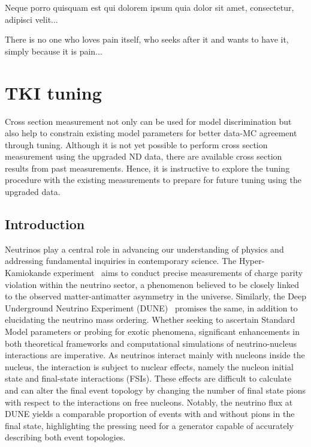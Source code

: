 \begin{savequote}[8cm]
\textlatin{Neque porro quisquam est qui dolorem ipsum quia dolor sit amet, consectetur, adipisci velit...}

There is no one who loves pain itself, who seeks after it and wants to have it, simply because it is pain...
\end{savequote}

\chapter{\label{ch:tuning}TKI tuning} 

\minitoc

Cross section measurement not only can be used for model discrimination but also help to constrain existing model parameters for better data-MC agreement through tuning. 
Although it is not yet possible to perform cross section measurement using the upgraded ND data, there are available cross section results from past measurements. 
Hence, it is instructive to explore the tuning procedure with the existing measurements to prepare for future tuning using the upgraded data.


\section{\label{sec:1-intro}Introduction}

Neutrinos play a central role in advancing our understanding of physics and addressing fundamental inquiries in contemporary science. The Hyper-Kamiokande experiment~\cite{Hyper-Kamiokande:2018ofw} aims to conduct precise measurements of charge parity violation within the neutrino sector, a phenomenon believed to be closely linked to the observed matter-antimatter asymmetry in the universe. Similarly, the Deep Underground Neutrino Experiment (DUNE)~\cite{DUNE:2016hlj,DUNE:2015lol,DUNE:2016evb,DUNE:2016rla,DUNE:2021tad}  promises the same, in addition to elucidating the neutrino mass ordering. Whether seeking to ascertain Standard Model parameters or probing for exotic phenomena, significant enhancements in both theoretical frameworks and computational simulations of neutrino-nucleus interactions are imperative. As neutrinos interact mainly with nucleons inside the nucleus, the interaction is subject to nuclear effects, namely the nucleon initial state and final-state interactions (FSIs). These effects are difficult to calculate and can alter the final event topology by changing the number of final state pions with respect to the interactions on free nucleons. Notably, the neutrino flux at DUNE yields a comparable proportion of events with and without pions in the final state, highlighting the pressing need for a generator capable of accurately describing both event topologies.

